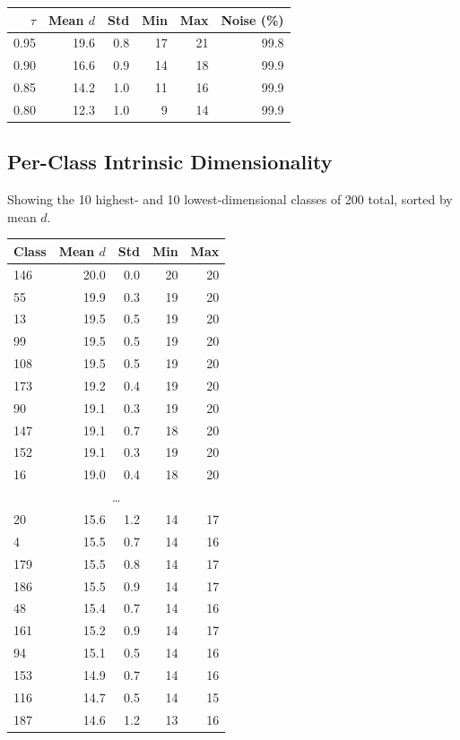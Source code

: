\documentclass[11pt,letterpaper]{article}
\begin{document}
\begin{tabular}{@{}rrrrrr@{}}
\toprule
$\tau$ & Mean $d$ & Std & Min & Max & Noise (\%) \\
\midrule
  0.95 & 19.6 & 0.8 & 17 & 21 & 99.8 \\
  0.90 & 16.6 & 0.9 & 14 & 18 & 99.9 \\
  0.85 & 14.2 & 1.0 & 11 & 16 & 99.9 \\
  0.80 & 12.3 & 1.0 & 9 & 14 & 99.9 \\
\bottomrule
\end{tabular}

\subsection{Per-Class Intrinsic Dimensionality}

Showing the 10 highest- and 10 lowest-dimensional classes of 200 total, sorted by mean $d$.

\begin{tabular}{@{}lrrrr@{}}
\toprule
Class & Mean $d$ & Std & Min & Max \\
\midrule
  146 & 20.0 & 0.0 & 20 & 20 \\
  55 & 19.9 & 0.3 & 19 & 20 \\
  13 & 19.5 & 0.5 & 19 & 20 \\
  99 & 19.5 & 0.5 & 19 & 20 \\
  108 & 19.5 & 0.5 & 19 & 20 \\
  173 & 19.2 & 0.4 & 19 & 20 \\
  90 & 19.1 & 0.3 & 19 & 20 \\
  147 & 19.1 & 0.7 & 18 & 20 \\
  152 & 19.1 & 0.3 & 19 & 20 \\
  16 & 19.0 & 0.4 & 18 & 20 \\
  \multicolumn{5}{c}{\ldots} \\
  20 & 15.6 & 1.2 & 14 & 17 \\
  4 & 15.5 & 0.7 & 14 & 16 \\
  179 & 15.5 & 0.8 & 14 & 17 \\
  186 & 15.5 & 0.9 & 14 & 17 \\
  48 & 15.4 & 0.7 & 14 & 16 \\
  161 & 15.2 & 0.9 & 14 & 17 \\
  94 & 15.1 & 0.5 & 14 & 16 \\
  153 & 14.9 & 0.7 & 14 & 16 \\
  116 & 14.7 & 0.5 & 14 & 15 \\
  187 & 14.6 & 1.2 & 13 & 16 \\
\bottomrule
\end{tabular}
\end{document}
